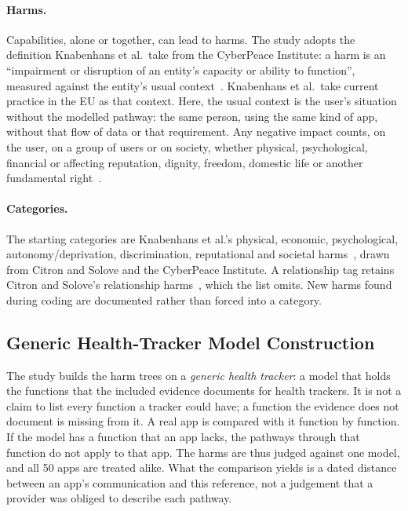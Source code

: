 \paragraph{Harms.} Capabilities, alone or together, can lead to harms. The
study adopts the definition Knabenhans et al.\ take from the CyberPeace
Institute: a harm is an \enquote{impairment or disruption of an entity's
capacity or ability to function}, measured against the entity's usual
context~\parencite[\S4.1]{knabenhans2026harms}. Knabenhans et al.\ take
current practice in the EU as that context. Here, the usual context is the
user's situation without the modelled pathway: the same person, using the same
kind of app, without that flow of data or that requirement. Any negative
impact counts, on the user, on a group of users or on society, whether
physical, psychological, financial or affecting reputation, dignity, freedom,
domestic life or another fundamental
right~\parencite[\S4.1]{knabenhans2026harms}.

\paragraph{Categories.} The starting categories are Knabenhans et al.'s physical, economic,
psychological, autonomy/\allowbreak deprivation, discrimination, reputational
and societal harms~\parencite[App.~A]{knabenhans2026harms}, drawn from Citron
and Solove and the CyberPeace Institute. A relationship tag retains Citron and
Solove's relationship harms~\parencite{citron2021harms}, which the list omits.
New harms found during coding are documented rather than forced into a
category.

\subsection{Generic Health-Tracker Model Construction}
\label{sec:generic-model}
The study builds the harm trees on a \emph{generic health tracker}: a model that holds
the functions that the included evidence documents for health trackers. It is not a claim to
list every function a tracker could have; a function the evidence does not document is missing
from it. A real app is compared with it function by function. If the model
has a function that an app lacks, the pathways through that function do not apply to
that app. The harms are thus judged against one model, and all 50 apps are treated
alike. What the comparison yields is a dated distance between an app's communication and this
reference, not a judgement that a provider was obliged to describe each pathway.

